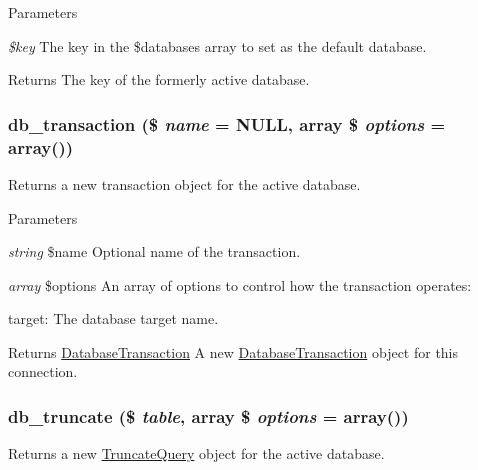 \begin{DoxyParams}{Parameters}
\item[{\em \$key}]The key in the \$databases array to set as the default database.\end{DoxyParams}
\begin{DoxyReturn}{Returns}
The key of the formerly active database. 
\end{DoxyReturn}
\hypertarget{group__database_gabdd0e69f5b2c63f8ad9e76f0fdf552be}{
\subsubsection[{db\_\-transaction}]{\setlength{\rightskip}{0pt plus 5cm}db\_\-transaction (\$ {\em name} = {\ttfamily NULL}, \/  array \$ {\em options} = {\ttfamily array()})}}
\label{group__database_gabdd0e69f5b2c63f8ad9e76f0fdf552be}
Returns a new transaction object for the active database.


\begin{DoxyParams}{Parameters}
\item[{\em string}]\$name Optional name of the transaction. \item[{\em array}]\$options An array of options to control how the transaction operates:
\begin{DoxyItemize}
\item target: The database target name.
\end{DoxyItemize}\end{DoxyParams}
\begin{DoxyReturn}{Returns}
\hyperlink{classDatabaseTransaction}{DatabaseTransaction} A new \hyperlink{classDatabaseTransaction}{DatabaseTransaction} object for this connection. 
\end{DoxyReturn}
\hypertarget{group__database_gaf6b4b59f572821cfd043317b81eeb71e}{
\subsubsection[{db\_\-truncate}]{\setlength{\rightskip}{0pt plus 5cm}db\_\-truncate (\$ {\em table}, \/  array \$ {\em options} = {\ttfamily array()})}}
\label{group__database_gaf6b4b59f572821cfd043317b81eeb71e}
Returns a new \hyperlink{classTruncateQuery}{TruncateQuery} object for the active database.


